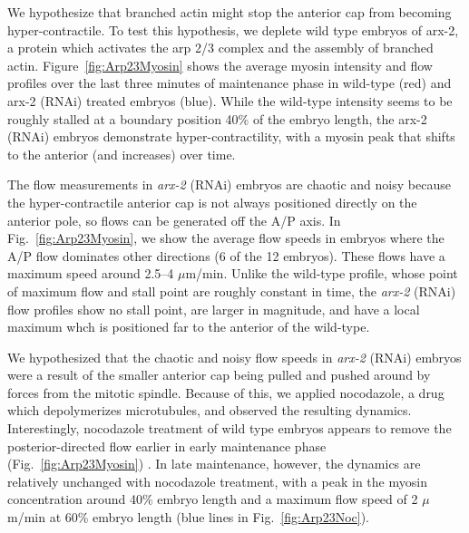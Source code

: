 \documentclass[11pt]{article}
\newcommand{\6}[1]{#1_{\text{6}}}
\newcommand{\3}[1]{#1_{\text{3}}}
\begin{document}
We hypothesize that branched actin might stop the anterior cap from becoming hyper-contractile. To test this hypothesis, we deplete wild type embryos of arx-2, a protein which activates the arp 2/3 complex and the assembly of branched actin. Figure\ \ref{fig:Arp23Myosin} shows the average myosin intensity and flow profiles over the last three minutes of maintenance phase in wild-type (red) and arx-2 (RNAi) treated embryos (blue). While the wild-type intensity seems to be roughly stalled at a boundary position 40\% of the embryo length, the arx-2 (RNAi) embryos demonstrate hyper-contractility, with a myosin peak that shifts to the anterior (and increases) over time.

The flow measurements in \emph{arx-2} (RNAi) embryos are chaotic and noisy because the hyper-contractile anterior cap is not always positioned directly on the anterior pole, so flows can be generated off the A/P axis. In Fig.\ \ref{fig:Arp23Myosin}, we show the average flow speeds in embryos where the A/P flow dominates other directions (6 of the 12 embryos). These flows have a maximum speed around 2.5--4 $\mu$m/min. Unlike the wild-type profile, whose point of maximum flow and stall point are roughly constant in time, the \emph{arx-2} (RNAi) flow profiles show no stall point, are larger in magnitude, and have a local maximum whch is positioned far to the anterior of the wild-type. 

We hypothesized that the chaotic and noisy flow speeds in \emph{arx-2} (RNAi) embryos were a result of the smaller anterior cap being pulled and pushed around by forces from the mitotic spindle. Because of this, we applied nocodazole, a drug which depolymerizes microtubules, and observed the resulting dynamics. Interestingly, nocodazole treatment of wild type embryos appears to remove the posterior-directed flow earlier in early maintenance phase (Fig.\ \ref{fig:Arp23Myosin}) \citep{sailer2015dynamic}. In late maintenance, however, the dynamics are relatively unchanged with nocodazole treatment, with a peak in the myosin concentration around 40\% embryo length and a maximum flow speed of 2 $\mu$m/min at 60\% embryo length (blue lines in Fig.\ \ref{fig:Arp23Noc}).
\end{document}

